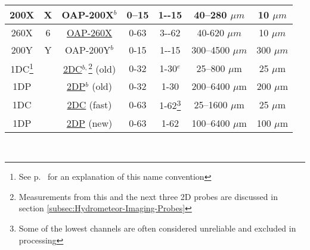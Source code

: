 \begin{center}
\begin{minipage}[t]{1\columnwidth}
\begin{center}
\begin{tabular}{|c|c|c|c|c|c|c|}
\hline 
{\small{}200X} & {\small{}X} & OAP-200X{\small{}$^{b}$} & {\small{}0--15} & {\small{}1-{}-15} & {\small{}40--280 $\mu m$} & {\small{}10 $\mu m$}\tabularnewline
\hline 
{\small{}260X} & {\small{}6} & \href{http://www.eol.ucar.edu/raf/Bulletins/B24/260X.html}{OAP-260X} & {\small{}0-63} & {\small{}3-{}-62} & {\small{}40-620 $\mu m$} & {\small{}10 $\mu m$}\tabularnewline
\hline 
{\small{}200Y} & {\small{}Y} & {\small{}OAP-200Y$^{b}$} & {\small{}0-15} & {\small{}1-{}-15} & {\small{}300--4500 $\mu m$} & {\small{}300 $\mu m$}\tabularnewline
\hline 
1DC\footnote{See p.~\pageref{Despite-the-'1D'} for an explanation of this name
convention}  &  & \href{http://www.eol.ucar.edu/raf/Bulletins/B24/2dProbes.html}{2DC}$^{b,}$\footnote{Measurements from this and the next three 2D probes are discussed
in section \vref{subsec:Hydrometeor-Imaging-Probes}} (old) & 0-32 & 1-30$^{e}$ & 25--800 $\mu$m  & 25 $\mu$m\tabularnewline
\hline 
1DP &  & \href{http://www.eol.ucar.edu/raf/Bulletins/B24/2dProbes.html}{2DP}$^{b}$
(old) & 0-32 & 1-30 & 200--6400 $\mu$m & 200 $\mu$m\tabularnewline
\hline 
1DC  &  & \href{https://www.eol.ucar.edu/instruments/two-dimensional-optical-array-cloud-probe}{2DC}
(fast) & 0-63 & 1-62\footnote{Some of the lowest channels are often considered unreliable and excluded
in processing} & 25--1600 $\mu$m & 25 $\mu$m\tabularnewline
\hline 
1DP &  & \href{https://www.eol.ucar.edu/instruments/two-dimensional-optical-array-precipitation-probe}{2DP}
(new) & 0-63 & 1-62 & 100--6400 $\mu$m & 100 $\mu$m\tabularnewline
\hline 
\end{tabular}
\par\end{center}%
\end{minipage}\\
\par\end{center}

